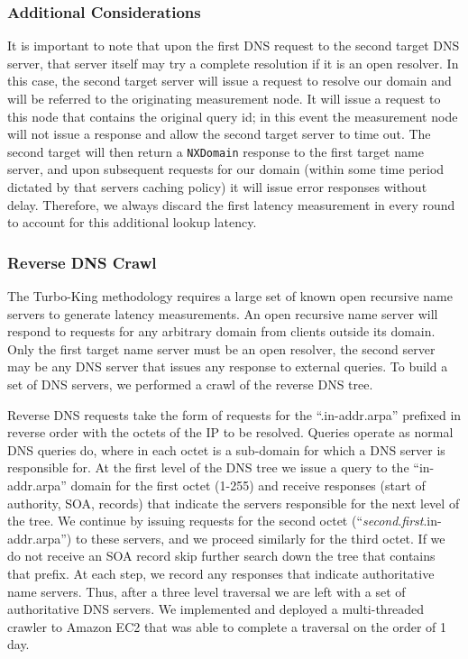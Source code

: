 \subsubsection{Additional Considerations}
It is important to note that upon the first DNS request to the second target DNS server, that server itself may try a complete resolution if it is an open resolver. In this case, the second target server will issue a request to resolve our domain and will be referred to the originating measurement node. It will issue a request to this node that contains the original query id; in this event the measurement node will not issue a response and allow the second target server to time out. The second target will then return a \texttt{NXDomain} response to the first target name server, and upon subsequent requests for our domain (within some time period dictated by that servers caching policy) it will issue error responses without delay. Therefore, we always discard the first latency measurement in every round to account for this additional lookup latency.

\subsubsection{Reverse DNS Crawl}
The Turbo-King methodology requires a large set of known open recursive name servers to generate latency measurements. An open recursive name server will respond to requests for any arbitrary domain from clients outside its domain. Only the first target name server must be an open resolver, the second server may be any DNS server that issues any response to external queries. To build a set of DNS servers, we performed a crawl of the reverse DNS tree.

Reverse DNS requests take the form of requests for the ``.in-addr.arpa'' prefixed in reverse order with the octets of the IP to be resolved. Queries operate as normal DNS queries do, where in each octet is a sub-domain for which a DNS server is responsible for.
At the first level of the DNS tree we issue a query to the ``in-addr.arpa'' domain for the first octet (1-255) and receive responses (start of authority, SOA, records) that indicate the servers responsible for the next level of the tree. We continue by issuing requests for the second octet (``{\it second}.{\it first}.in-addr.arpa'') to these servers, and we proceed similarly for the third octet. If we do not receive an SOA record skip further search down the tree that contains that prefix. At each step, we record any responses that indicate authoritative name servers. Thus, after a three level traversal we are left with a set of authoritative DNS servers. We implemented and deployed a multi-threaded crawler to Amazon EC2 that was able to complete a traversal on the order of 1 day.

